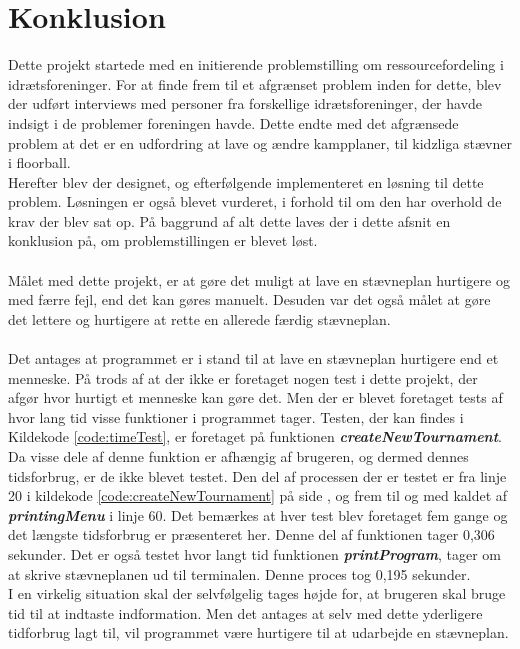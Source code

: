 \chapter{Konklusion}\label{ch:conclusion}

Dette projekt startede med en initierende problemstilling om ressourcefordeling i idrætsforeninger. For at finde frem til et afgrænset problem inden for dette, blev der udført interviews med personer fra forskellige idrætsforeninger, der havde indsigt i de problemer foreningen havde. Dette endte med det afgrænsede problem at det er en udfordring at lave og ændre kampplaner, til kidzliga stævner i floorball. 
\\
Herefter blev der designet, og efterfølgende implementeret en løsning til dette problem. Løsningen er også blevet vurderet, i forhold til om den har overhold de krav der blev sat op. 
På baggrund af alt dette laves der i dette afsnit en konklusion på, om problemstillingen er blevet løst.
\\\\
Målet med dette projekt, er at gøre det muligt at lave en stævneplan hurtigere og med færre fejl, end det kan gøres manuelt. Desuden var det også målet at gøre det lettere og hurtigere at rette en allerede færdig stævneplan. 
\\\\
Det antages at programmet er i stand til at lave en stævneplan hurtigere end et menneske. På trods af at der ikke er foretaget nogen test i dette projekt, der afgør hvor hurtigt et menneske kan gøre det. Men der er blevet foretaget tests af hvor lang tid visse funktioner i programmet tager. 
Testen, der kan findes i Kildekode \ref{code:timeTest}, er foretaget på funktionen \textbf{\textit{createNewTournament}}. Da visse dele af denne funktion er afhængig af brugeren, og dermed dennes tidsforbrug, er de ikke blevet testet. Den del af processen der er testet er fra linje 20 i kildekode \ref{code:createNewTournament} på side \pageref{code:createNewTournament}, og frem til og med kaldet af \textbf{\textit{printingMenu}} i linje 60. Det bemærkes at hver test blev foretaget fem gange og det længste tidsforbrug er præsenteret her. Denne del af funktionen tager 0,306 sekunder.
Det er også testet hvor langt tid funktionen \textbf{\textit{printProgram}}, tager om at skrive stævneplanen ud til terminalen. Denne proces tog 0,195 sekunder.
\\
I en virkelig situation skal der selvfølgelig tages højde for, at brugeren skal bruge tid til at indtaste indformation. Men det antages at selv med dette yderligere tidforbrug lagt til, vil programmet være hurtigere til at udarbejde en stævneplan.

